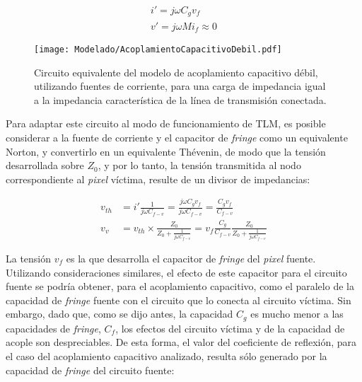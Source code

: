 \begin{subequations}
	\label{eq:expresiones-fuentes-controladas}
	\begin{align}
		i' = j \omega C_g v_f \\
		v' = j \omega M i_f \approx 0
	\end{align}
\end{subequations}

\begin{figure}[htp]
	\centering
	\texttt{[image: Modelado/AcoplamientoCapacitivoDebil.pdf]}
	\caption{Circuito equivalente del modelo de acoplamiento capacitivo débil, utilizando fuentes de corriente, para una carga de impedancia igual a la impedancia característica de la línea de transmisión conectada.}
	\label{fig:circuito-equivalente-acoplamiento-capacitivo-debil}
\end{figure}

Para adaptar este circuito al modo de funcionamiento de TLM, es posible considerar a la fuente de corriente y el capacitor de \textit{fringe} como un equivalente Norton, y convertirlo en un equivalente Thévenin, de modo que la tensión desarrollada sobre $Z_0$, y por lo tanto, la tensión transmitida al nodo correspondiente al \textit{pixel} víctima, resulte de un divisor de impedancias:

\begin{align}
	v_{th} & = i' \frac{1}{j\omega C_{f-v}} = \frac{j\omega C_g v_f}{j\omega C_{f-v}} = \frac{C_g v_f}{C_{f-v}} \\
	v_v & = v_{th} \times \frac{Z_0}{Z_0 + \frac{1}{j\omega C_{f-v}}} = v_f \frac{C_g}{C_{f-v}} \frac{Z_0}{Z_0 + \frac{1}{j\omega C_{f-v}}}
\end{align}



La tensión $v_f$ es la que desarrolla el capacitor de \textit{fringe} del \textit{pixel} fuente. Utilizando consideraciones similares, el efecto de este capacitor para el circuito fuente se podría obtener, para el acoplamiento capacitivo, como el paralelo de la capacidad de \textit{fringe} fuente con el circuito que lo conecta al circuito víctima. Sin embargo, dado que, como se dijo antes, la capacidad $C_g$ es mucho menor a las capacidades de \textit{fringe}, $C_{f}$, los efectos del circuito víctima y de la capacidad de acople son despreciables. De esta forma, el valor del coeficiente de reflexión, para el caso del acoplamiento capacitivo analizado, resulta sólo generado por la capacidad de \textit{fringe} del circuito fuente:

